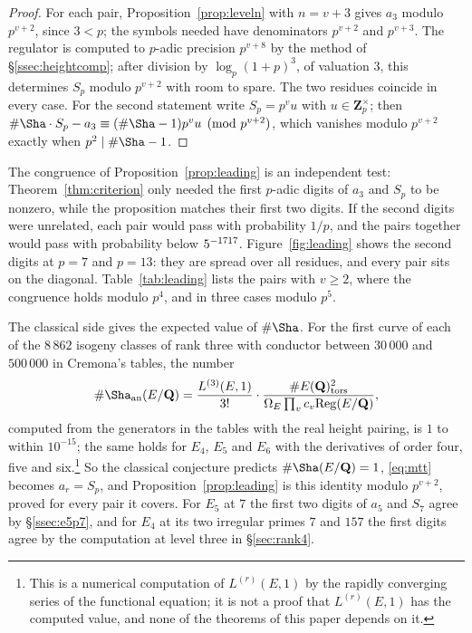 \documentclass[11pt]{amsart}
\theoremstyle{definition}
\newcommand{\Q}{\mathbf{Q}}
\newcommand{\Zp}{\mathbf{Z}_p}
\newcommand{\Reg}{\mathrm{Reg}}
\newcommand{\tors}{\mathrm{tors}}
\begin{document}
\begin{proof}
For each pair, Proposition~\ref{prop:leveln} with $n=v+3$ gives $a_3$ modulo $p^{v+2}$, since $3<p$; the symbols needed have denominators $p^{v+2}$ and $p^{v+3}$. The regulator is computed to $p$-adic precision $p^{v+8}$ by the method of \S\ref{ssec:heightcomp}; after division by $\log_p(1+p)^3$, of valuation $3$, this determines $S_p$ modulo $p^{v+2}$ with room to spare. The two residues coincide in every case. For the second statement write $S_p=p^vu$ with $u\in\Zp^\times$; then $\#\Sha\cdot S_p-a_3\equiv(\#\Sha-1)p^vu\pmod{p^{v+2}}$, which vanishes modulo $p^{v+2}$ exactly when $p^2\mid\#\Sha-1$.
\end{proof}

The congruence of Proposition~\ref{prop:leading} is an independent test: Theorem~\ref{thm:criterion} only needed the first $p$-adic digits of $a_3$ and $S_p$ to be nonzero, while the proposition matches their first two digits. If the second digits were unrelated, each pair would pass with probability $1/p$, and the \NLpairs{} pairs together would pass with probability below $5^{-1717}$. Figure~\ref{fig:leading} shows the second digits at $p=7$ and $p=13$: they are spread over all residues, and every pair sits on the diagonal. Table~\ref{tab:leading} lists the pairs with $v\ge2$, where the congruence holds modulo $p^4$, and in three cases modulo $p^5$.

The classical side gives the expected value of $\#\Sha$. For the first curve of each of the $8\,862$ isogeny classes of rank three with conductor between $30\,000$ and $500\,000$ in Cremona's tables, the number
\[
\#\Sha_{\mathrm{an}}(E/\Q)=\frac{L^{(3)}(E,1)}{3!}\cdot\frac{\#E(\Q)_\tors^2}{\Omega_E\prod_vc_v\Reg(E/\Q)},
\]
computed from the generators in the tables with the real height pairing, is $1$ to within $10^{-15}$; the same holds for $E_4$, $E_5$ and $E_6$ with the derivatives of order four, five and six.\footnote{This is a numerical computation of $L^{(r)}(E,1)$ by the rapidly converging series of the functional equation; it is not a proof that $L^{(r)}(E,1)$ has the computed value, and none of the theorems of this paper depends on it.} So the classical conjecture predicts $\#\Sha(E/\Q)=1$, \eqref{eq:mtt} becomes $a_r=S_p$, and Proposition~\ref{prop:leading} is this identity modulo $p^{v+2}$, proved for every pair it covers. For $E_5$ at $7$ the first two digits of $a_5$ and $S_7$ agree by \S\ref{ssec:e5p7}, and for $E_4$ at its two irregular primes $7$ and $157$ the first digits agree by the computation at level three in \S\ref{sec:rank4}.
\end{document}
